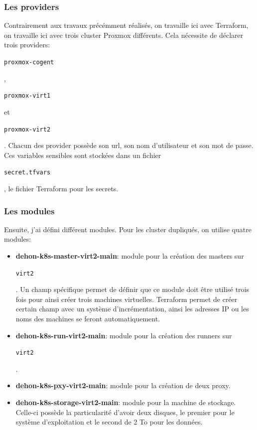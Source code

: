 \documentclass[12pt, a4paper, twoside]{article}
\begin{document}
\subsubsection{Les providers}
Contrairement aux travaux précémment réalisés, on travaille ici avec \gls{Terraform}, on travaille ici avec trois \gls{cluster} \gls{Proxmox} différents.
Cela nécessite de déclarer trois providers: \begin{code}\texttt{proxmox-cogent}\end{code},\begin{code}\texttt{proxmox-virt1}\end{code} et\begin{code}\texttt{proxmox-virt2}\end{code}.
Chacun des provider possède son url, son nom d'utilisateur et son mot de passe.
Ces variables sensibles sont stockées dans un fichier \begin{code}\texttt{secret.tfvars}\end{code}, le fichier \gls{Terraform} pour les secrets.

\subsubsection{Les modules}
Ensuite, j'ai défini différent modules. Pour les \gls{cluster} dupliqués, on utilise quatre modules:
\begin{itemize}
    \item \textbf{dehon-k8s-master-virt2-main}: module pour la création des masters sur \begin{code}\texttt{virt2}\end{code}.
    Un champ spécifique permet de définir que ce module doit être utilisé trois fois pour ainsi créer trois machines virtuelles.
    Terraform permet de créer certain champ avec un système d'incrémentation, ainsi les adresses \gls{IP} ou les noms des machines se feront automatiquement.
    \item \textbf{dehon-k8s-run-virt2-main}: module pour la création des runners sur \begin{code}\texttt{virt2}\end{code}.
    \item \textbf{dehon-k8s-pxy-virt2-main}: module pour la création de deux proxy.
    \item \textbf{dehon-k8s-storage-virt2-main}: module pour la machine de stockage.
    Celle-ci possède la particularité d'avoir deux disques, le premier pour le système d'exploitation et le second de 2 To pour les données.
\end{itemize}
\end{document}
